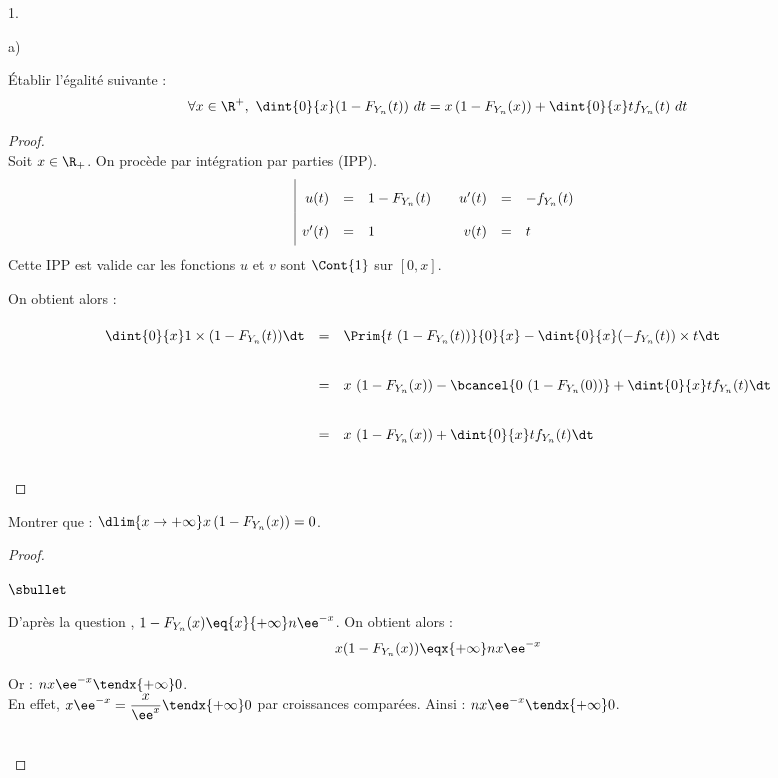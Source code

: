 \begin{noliste}{1.}
\begin{noliste}{a)}
  \item Établir l'égalité suivante :
    \[
    \forall x \in \R^+, \ \dint{0}{x} (1-F_{Y_{n}}(t)) \ dt =
    x\left(1-F_{Y_{n}}(x)\right) + \dint{0}{x} t f_{Y_{n}}(t) \ dt
    \]
    
    \begin{proof}~\\
      Soit $x\in\R_+$.
      On procède par intégration par parties (IPP).
        \[
        \renewcommand{\arraystretch}{2}
        \begin{array}{|rcl@{\qquad}rcl}
          u(t) & = & 1-F_{Y_n}(t) & u'(t) & = & -f_{Y_n}(t) \\
          v'(t) & = & 1 & v(t) & = & t
        \end{array}
        \]
      Cette IPP est valide car les fonctions $u$ et $v$ sont 
      $\Cont{1}$ sur $[0, x]$. 


      \newpage

      
      \noindent
      On obtient alors :
      \[
       \begin{array}{rcl}
        \dint{0}{x} 1 \times (1-F_{Y_n}(t))\dt & = & \Prim{ 
	t \ (1-F_{Y_n}(t))}{0}{x} - \dint{0}{x} (-f_{Y_n}(t)) \times 
	t\dt
        \\[.4cm]
        & = & x \ (1-F_{Y_n}(x)) - \bcancel{0 \ (1-F_{Y_n}(0))}
         + \dint{0}{x} tf_{Y_n}(t) \dt
        \\[.4cm]
        & = & x \ (1-F_{Y_n}(x)) + \dint{0}{x} tf_{Y_n}(t) \dt
       \end{array}
      \]
      ~\\[-1cm]
    \end{proof}
    
  \item Montrer que : $\dlim{ x \to + \infty} x\left(1-F_{Y_{n}}(x)
    \right) = 0$.
    
    \begin{proof}~%
      \begin{noliste}{$\sbullet$}
      \item D'après la question , $1-F_{Y_n}(x)
        \eq{x}{+\infty} n\ee^{-x}$. On obtient alors :
        \[
        x(1-F_{Y_n}(x)) \eqx{+\infty} nx\ee^{-x}
        \]

      \item Or : $nx\ee^{-x} \tendx{+\infty} 0$.\\
        En effet, $x\ee^{-x} = \dfrac{x}{\ee^x} \tendx{+\infty} 0$ par
        croissances comparées. Ainsi : $nx\ee^{-x} \tendx{+\infty} 0$.
      \end{noliste}
      ~\\[-1.2cm]
    \end{proof}
    

\end{noliste}
\end{noliste}
